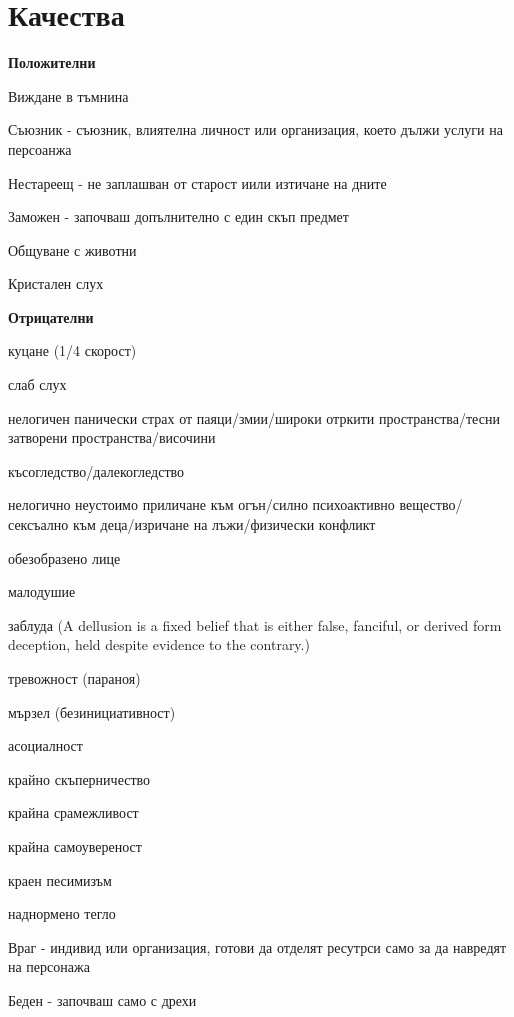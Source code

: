 \section{Качества}

\textbf{Положителни}
\begin{itemize*}
\item{Виждане в тъмнина}
\item{Съюзник - съюзник, влиятелна личност или организация, което дължи услуги на персоанжа}
\item{Нестареещ - не заплашван от старост иили изтичане на дните}
\item{Заможен - започваш допълнително с един скъп предмет}
\item{Общуване с животни}
\item{Кристален слух}
\end{itemize*}

\vspace{0.7cm}
\textbf{Отрицателни}
\begin{itemize*}
\item{куцане (1/4 скорост)}
\item{слаб слух}
\item{нелогичен панически страх от паяци/змии/широки отркити пространства/тесни затворени пространства/височини}
\item{късогледство/далекогледство}
\item{нелогично неустоимо приличане към огън/силно психоактивно вещество/сексъално към деца/изричане на лъжи/физически конфликт}
\item{обезобразено лице}
\item{малодушие}
\item{заблуда (A dellusion is a fixed belief that is either false, fanciful, or derived form deception, held despite evidence to the contrary.)}
\item{тревожност (параноя)}
\item{мързел (безинициативност)}
\item{асоциалност}
\item{крайно скъперничество}
\item{крайна срамежливост}
\item{крайна самоувереност}
\item{краен песимизъм}
\item{наднормено тегло}
\item{Враг - индивид или организация, готови да отделят ресутрси само за да навредят на персонажа}
\item{Беден - започваш само с дрехи}
\end{itemize*}

